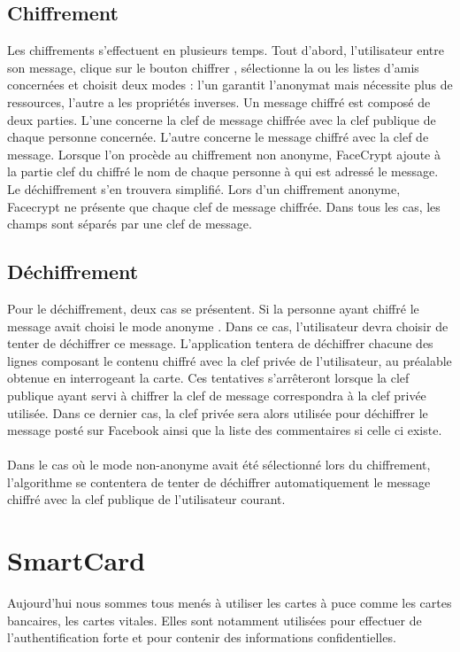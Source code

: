 \documentclass[a4paper,11pt,french]{article}
\begin{document}
\subsection{Chiffrement}
Les chiffrements s'effectuent en plusieurs temps. Tout d'abord, l'utilisateur 
entre son message, clique sur le bouton \og chiffrer \fg{}, sélectionne la ou les
listes d'amis concernées et choisit deux modes : l'un garantit l'anonymat mais
nécessite plus de ressources, l'autre a les propriétés inverses. Un message
chiffré est composé de deux parties. L'une concerne la clef de message chiffrée
avec la clef publique de chaque personne concernée. L'autre concerne le message
chiffré avec la clef de message. Lorsque l'on procède au chiffrement non anonyme,
FaceCrypt ajoute à la partie clef du chiffré le nom de chaque personne à qui est
adressé le message. Le déchiffrement s'en trouvera simplifié. Lors d'un
chiffrement anonyme, Facecrypt ne présente que chaque clef de message chiffrée.
Dans tous les cas, les champs sont séparés par une clef de message.

\subsection{Déchiffrement}
Pour le déchiffrement, deux cas se présentent. Si la personne ayant chiffré le
message avait choisi le mode \og anonyme \fg{}. Dans ce cas, l'utilisateur devra
choisir de tenter de déchiffrer ce message. L'application tentera de déchiffrer
chacune des lignes composant le contenu chiffré avec la clef privée de
l'utilisateur, au préalable obtenue en interrogeant la carte. Ces tentatives
s'arrêteront lorsque la clef publique ayant servi à chiffrer la clef de message
correspondra à la clef privée utilisée. Dans ce dernier cas, la clef privée sera
alors utilisée pour déchiffrer le message posté sur Facebook ainsi que la liste
des commentaires si celle ci existe.

\paragraph{}
Dans le cas où le mode \og non-anonyme \fg{} avait été sélectionné lors du
chiffrement, l'algorithme se contentera de tenter de déchiffrer automatiquement
le message chiffré avec la clef publique de l'utilisateur courant.


\section{SmartCard}
Aujourd'hui nous sommes tous menés à utiliser les cartes à puce comme les cartes
bancaires, les cartes vitales. Elles sont notamment utilisées pour effectuer de 
l'authentification forte et pour contenir des informations confidentielles.
\end{document}
